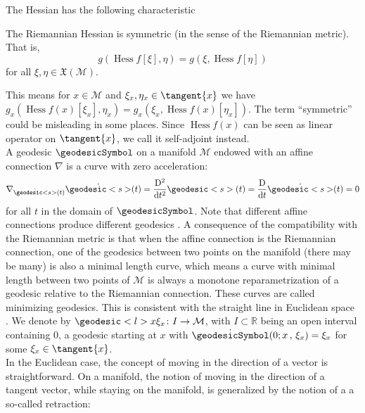 The Hessian has the following characteristic

\begin{proposition}
    The Riemannian Hessian is symmetric (in the sense of the Riemannian metric). That is, 
    \begin{equation*}
        g(\operatorname{Hess} f [\xi], \eta ) = g(\xi, \operatorname{Hess} f [\eta] )
    \end{equation*}
    for all $\xi, \eta \in \mathfrak{X}(\mathcal{M})$.
\end{proposition}

This means for $x \in \mathcal{M}$ and $\xi_x, \eta_x \in \tangent{x}$ we have $g_x(\operatorname{Hess} f(x) [\xi_x], \eta_x ) = g_x(\xi_x, \operatorname{Hess} f(x) [\eta_x] )$. The term “symmetric” could be misleading in some places. Since $\operatorname{Hess} f(x)$ can be seen as linear operator on $\tangent{x}$, we call it self-adjoint instead. \\
A geodesic $\geodesicSymbol$ on a manifold $\mathcal{M}$ endowed with an affine connection $\nabla$ is a curve with zero acceleration:
\begin{equation*}
    \nabla_{\dot{\geodesic<s>}(t)} \dot{\geodesic<s>}(t) = \frac{\mathrm{D}^2}{\mathrm{d}t^2} \geodesic<s>(t) = \frac{\mathrm{D}}{\mathrm{d}t} \dot{\geodesic<s>}(t) = 0
\end{equation*}
for all $t$ in the domain of $\geodesicSymbol$. Note that different affine connections produce different geodesics \cite[p.~102]{AbsilMahonySepulchre:2008}. A consequence of the compatibility with the Riemannian metric is that when the affine connection is the Riemannian connection, one of the geodesics between two points on the manifold (there may be many) is also a minimal length curve, which means a curve with minimal length between two points of $\mathcal{M}$ is always a monotone reparametrization of a geodesic relative to the Riemannian connection. These curves are called minimizing geodesics. This is consistent with the straight line in Euclidean space \cite[p.~7]{Huang:2013}. We denote by $\geodesic<l>{x}{\xi_x} \colon I \to \mathcal{M}$, with $I \subset \mathbb{R}$ being an open interval containing $0$, a geodesic starting at $x$ with $\dot{\geodesicSymbol}(0; x \, , \, \xi_x) = \xi_x$ for some $\xi_x \in \tangent{x}$. \\
In the Euclidean case, the concept of moving in the direction of a vector is straightforward. On a manifold, the notion of moving in the direction of a tangent vector, while staying on the manifold, is generalized by the notion of a a so-called retraction:

